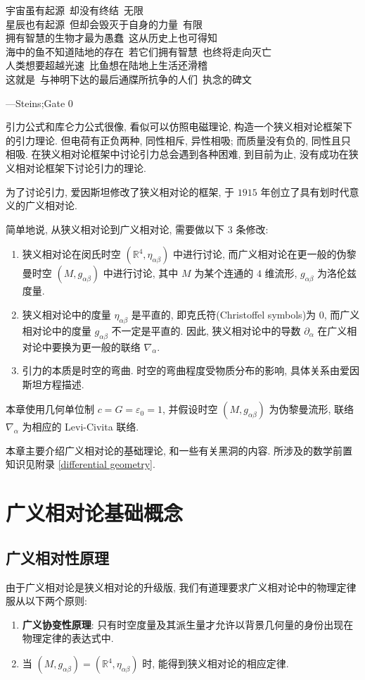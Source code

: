 \renewcommand{\textflush}{flushright}
\epigraph{
	宇宙虽有起源~却没有终结~无限\\
	星辰也有起源~但却会毁灭于自身的力量~有限\\
	拥有智慧的生物才最为愚蠢~这从历史上也可得知\\
	海中的鱼不知道陆地的存在~若它们拥有智慧~也终将走向灭亡\\
	人类想要超越光速~比鱼想在陆地上生活还滑稽\\
	这就是~与神明下达的最后通牒所抗争的人们~执念的碑文\vspace{1ex}
}{---Steins;Gate 0}
\renewcommand{\textflush}{flushleft}
引力公式和库仑力公式很像, 看似可以仿照电磁理论, 构造一个狭义相对论框架下的引力理论. 但电荷有正负两种, 同性相斥, 异性相吸; 而质量没有负的, 同性且只相吸. 在狭义相对论框架中讨论引力总会遇到各种困难, 到目前为止, 没有成功在狭义相对论框架下讨论引力的理论.

为了讨论引力, 爱因斯坦修改了狭义相对论的框架, 于 $1915$ 年创立了具有划时代意义的广义相对论. 

简单地说, 从狭义相对论到广义相对论, 需要做以下 $3$ 条修改:
\begin{enumerate}
	\item 狭义相对论在闵氏时空 $(\mathbb{R}^4,\eta_{\alpha\beta})$ 中进行讨论, 而广义相对论在更一般的伪黎曼时空 $(M,g_{\alpha\beta})$ 中进行讨论, 其中 $M$ 为某个连通的 $4$ 维流形, $g_{\alpha\beta}$ 为洛伦兹度量.
	\item 狭义相对论中的度量 $\eta_{\alpha\beta}$ 是平直的, 即克氏符(Christoffel  symbols)为 $0$, 而广义相对论中的度量 $g_{\alpha\beta}$ 不一定是平直的. 因此, 狭义相对论中的导数 $\partial_\alpha$ 在广义相对论中要换为更一般的联络 $\nabla_\alpha$.
	\item 引力的本质是时空的弯曲. 时空的弯曲程度受物质分布的影响, 具体关系由爱因斯坦方程描述.
\end{enumerate}
本章使用几何单位制 $c=G=\varepsilon_0=1$, 并假设时空 $(M,g_{\alpha\beta})$ 为伪黎曼流形, 联络 $\nabla_\alpha$ 为相应的 Levi-Civita 联络.

本章主要介绍广义相对论的基础理论, 和一些有关黑洞的内容. 所涉及的数学前置知识见附录 \ref{differential geometry}.

\section{广义相对论基础概念}
\subsection{广义相对性原理}
由于广义相对论是狭义相对论的升级版, 我们有道理要求广义相对论中的物理定律服从以下两个原则:
\begin{enumerate}
	\item {\bf 广义协变性原理}: 只有时空度量及其派生量才允许以背景几何量的身份出现在物理定律的表达式中.
	\item 当 $(M,g_{\alpha\beta})=(\mathbb{R}^4,\eta_{\alpha\beta})$ 时, 能得到狭义相对论的相应定律.
\end{enumerate}

